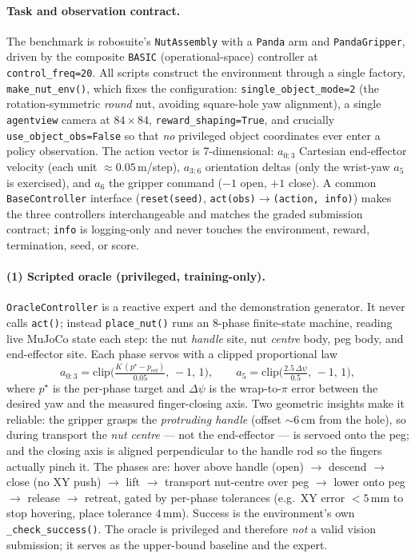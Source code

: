 \documentclass[10pt]{article}
\newcommand{\code}[1]{\texttt{\small #1}}
\begin{document}
\paragraph{Task and observation contract.}
The benchmark is robosuite's \code{NutAssembly} with a \code{Panda} arm and
\code{PandaGripper}, driven by the composite \code{BASIC} (operational-space)
controller at \code{control\_freq=20}. All scripts construct the environment
through a single factory, \code{make\_nut\_env()}, which fixes the configuration:
\code{single\_object\_mode=2} (the rotation-symmetric \emph{round} nut, avoiding
square-hole yaw alignment), a single \code{agentview} camera at $84{\times}84$,
\code{reward\_shaping=True}, and crucially \code{use\_object\_obs=False} so that
\emph{no} privileged object coordinates ever enter a policy observation. The
action vector is 7-dimensional: $a_{0:3}$ Cartesian end-effector velocity (each
unit $\approx 0.05$\,m/step), $a_{3:6}$ orientation deltas (only the wrist-yaw
$a_5$ is exercised), and $a_6$ the gripper command ($-1$ open, $+1$ close). A
common \code{BaseController} interface (\code{reset(seed)}, \code{act(obs)$\to$(action,
info)}) makes the three controllers interchangeable and matches the graded
submission contract; \code{info} is logging-only and never touches the
environment, reward, termination, seed, or score.

\paragraph{(1) Scripted oracle (privileged, training-only).}
\code{OracleController} is a reactive expert and the demonstration generator. It
never calls \code{act()}; instead \code{place\_nut()} runs an 8-phase finite-state
machine, reading live MuJoCo state each step: the nut \emph{handle} site, nut
\emph{centre} body, peg body, and end-effector site. Each phase servos with a
clipped proportional law
\[
  a_{0:3} = \mathrm{clip}\!\Big(\tfrac{K\,(p^{\star}-p_{\text{eef}})}{0.05},\,-1,\,1\Big),
  \qquad
  a_5 = \mathrm{clip}\!\Big(\tfrac{2.5\,\Delta\psi}{0.5},\,-1,\,1\Big),
\]
where $p^\star$ is the per-phase target and $\Delta\psi$ is the wrap-to-$\pi$ error
between the desired yaw and the measured finger-closing axis. Two geometric
insights make it reliable: the gripper grasps the \emph{protruding handle} (offset
$\sim$6\,cm from the hole), so during transport the \emph{nut centre} --- not the
end-effector --- is servoed onto the peg; and the closing axis is aligned
perpendicular to the handle rod so the fingers actually pinch it. The phases are:
hover above handle (open) $\to$ descend $\to$ close (no XY push) $\to$ lift $\to$
transport nut-centre over peg $\to$ lower onto peg $\to$ release $\to$ retreat,
gated by per-phase tolerances (e.g.\ XY error $<5$\,mm to stop hovering, place
tolerance $4$\,mm). Success is the environment's own \code{\_check\_success()}.
The oracle is privileged and therefore \emph{not} a valid vision submission; it
serves as the upper-bound baseline and the expert.
\end{document}
